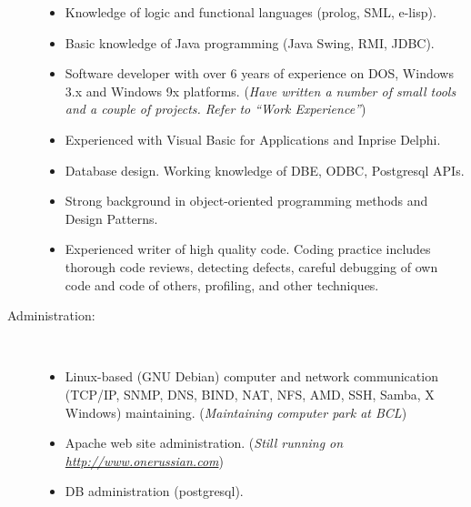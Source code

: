 \documentclass[10pt,overlapped,line]{res}
\newcommand{\wdescription}[1]{({\small \textit{#1}})}
\begin{document}
\begin{resume}
\begin{description}
\begin{itemize}
     \item Knowledge of logic and functional languages (prolog, SML, e-lisp).

     \item Basic knowledge of Java programming (Java Swing, RMI,
       JDBC).

     \item Software developer with over 6 years of experience on DOS,
       Windows 3.x and Windows 9x platforms.
       \wdescription{Have written a number of small tools and a couple of
         projects. Refer to ``Work Experience''}
     
     \item Experienced with Visual Basic for Applications and Inprise
       Delphi.

     \item Database design. Working knowledge of DBE, ODBC, Postgresql
       APIs. 
       
     \item Strong background in object-oriented programming methods
       and Design Patterns.

     \item Experienced writer of high quality code. Coding practice
       includes thorough code reviews, detecting defects, careful
       debugging of own code and code of others, profiling, and other
       techniques.
     \end{itemize} 

   \item[Administration:] \hspace*{\fill} \\ 
     \begin{itemize}
     \item Linux-based (GNU Debian) computer and network communication (TCP/IP,
       SNMP, DNS, BIND, NAT, NFS, AMD, SSH, Samba, X Windows) maintaining. 
       \wdescription{Maintaining computer park at BCL}
     \item Apache web site administration.
       \wdescription{Still running on \href{URL}{http://www.onerussian.com}}
     \item DB administration (postgresql).
     \end{itemize}


\end{description}
\end{resume}
\end{document}
